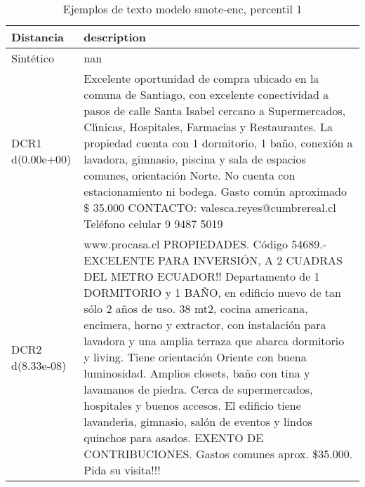 \begin{table}[H]
\centering
\fontsize{10}{14}\selectfont
\caption{Ejemplos de texto modelo smote-enc, percentil 1}
\label{table-example-economicos-a-2-smote-enc-1p-text}
\begin{tabular}{|l|m{35em}|}
\hline
\rowcolor[gray]{0.8}
Distancia & description \\
\hline Sintético & nan \\
\hline DCR1 d(0.00e+00) & Excelente oportunidad de compra ubicado en la comuna de Santiago, con excelente conectividad a pasos de calle Santa Isabel cercano a Supermercados, Cl{\'\i}nicas, Hospitales, Farmacias y Restaurantes. La propiedad cuenta con 1 dormitorio, 1 ba\~no, conexi\'on a lavadora, gimnasio, piscina y sala de espacios comunes, orientaci\'on Norte.
 No cuenta con estacionamiento ni bodega. Gasto com\'un aproximado \$ 35.000 CONTACTO: valesca.reyes@cumbrereal.cl Tel\'efono celular 9 9487 5019 \\
\hline DCR2 d(8.33e-08) & www.procasa.cl    PROPIEDADES. C\'odigo 54689.- EXCELENTE PARA INVERSI\'ON, A 2 CUADRAS DEL METRO ECUADOR!! Departamento de 1 DORMITORIO y 1 BA\~NO, en edificio nuevo de tan s\'olo 2 a\~nos de uso. 38 mt2, cocina americana, encimera, horno y extractor, con instalaci\'on para lavadora y una amplia terraza que abarca dormitorio y living. Tiene orientaci\'on Oriente con buena luminosidad. Amplios closets, ba\~no con tina y lavamanos de piedra. Cerca de supermercados, hospitales y buenos accesos. El edificio tiene lavander{\'\i}a, gimnasio, sal\'on de eventos y lindos quinchos para asados.   EXENTO DE CONTRIBUCIONES. Gastos comunes aprox. \$35.000.  Pida su visita!!! \\
\hline
\end{tabular}
\end{table}
